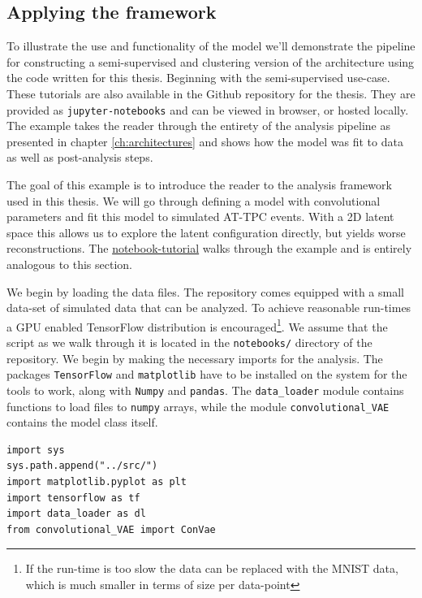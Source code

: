 \subsection{Applying the framework}

To illustrate the use and functionality of the model we'll demonstrate the pipeline for constructing a semi-supervised and clustering version of the architecture using the code written for this thesis. Beginning with the semi-supervised use-case. These tutorials are also available in the Github repository for the thesis. They are provided as \lstinline{jupyter-notebooks} and can be viewed in browser, or hosted locally. The example takes the reader through the entirety of the analysis pipeline as presented in chapter \ref{ch:architectures} and shows how the model was fit to data as well as post-analysis steps. 

The goal of this example is to introduce the reader to the analysis framework used in this thesis. We will go through defining a model with convolutional parameters and fit this model to simulated AT-TPC events. With a 2D latent space this allows us to explore the latent configuration directly, but yields worse reconstructions. The \href{https://github.com/ATTPC/VAE-event-classification/blob/master/notebooks/simulated_tutorial.ipynb}{notebook-tutorial} walks through the example and is entirely analogous to this section.

We begin by loading the data files. The repository comes equipped with a small data-set of simulated data that can be analyzed. To achieve reasonable run-times a GPU enabled TensorFlow distribution is encouraged\footnote{If the run-time is too slow the data can be replaced with the MNIST data, which is much smaller in terms of size per data-point}. We assume that the script as we walk through it is located in the \lstinline{notebooks/} directory of the repository. We begin by making the necessary imports for the analysis. The packages \lstinline{TensorFlow} and \lstinline{matplotlib} have to be installed on the system for the tools to work, along with \lstinline{Numpy} and \lstinline{pandas}. The \lstinline{data_loader} module contains functions to load files to \lstinline{numpy} arrays, while the module \lstinline{convolutional_VAE} contains the model class itself.

\begin{minipage}{\linewidth}
\begin{lstlisting}[language=iPython]
import sys
sys.path.append("../src/")
import matplotlib.pyplot as plt
import tensorflow as tf
import data_loader as dl
from convolutional_VAE import ConVae
\end{lstlisting}
\end{minipage}

